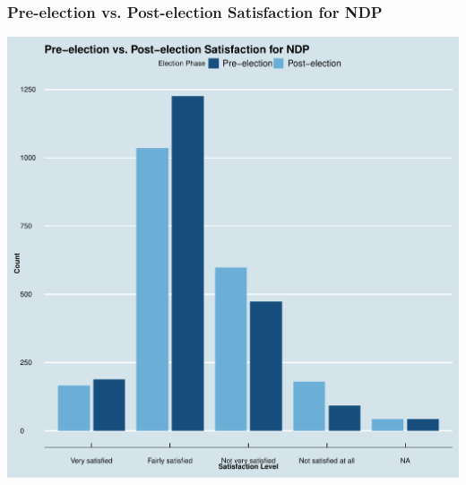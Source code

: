 \documentclass{beamer}
\begin{document}
\begin{frame}
    \frametitle{Pre-election vs. Post-election Satisfaction for NDP}
    \begin{center}
        \includegraphics[scale=0.3]{Pre-election vs. Post-election Satisfaction for NDP.pdf}
    \end{center}
\end{frame}

\end{document}
